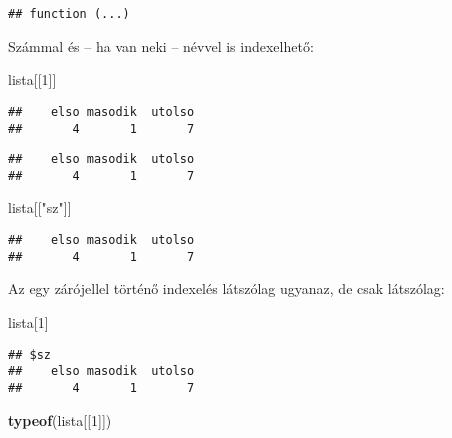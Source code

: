 \documentclass[]{book}
\newenvironment{Shaded}{\begin{snugshade}}{\end{snugshade}}
\newcommand{\KeywordTok}[1]{\textcolor[rgb]{0.13,0.29,0.53}{\textbf{#1}}}
\newcommand{\DecValTok}[1]{\textcolor[rgb]{0.00,0.00,0.81}{#1}}
\newcommand{\StringTok}[1]{\textcolor[rgb]{0.31,0.60,0.02}{#1}}
\newcommand{\OperatorTok}[1]{\textcolor[rgb]{0.81,0.36,0.00}{\textbf{#1}}}
\newcommand{\NormalTok}[1]{#1}
\begin{document}
\begin{verbatim}
## function (...)
\end{verbatim}

Számmal és -- ha van neki -- névvel is indexelhető:

\begin{Shaded}
\begin{Highlighting}[]
\NormalTok{lista[[}\DecValTok{1}\NormalTok{]]}
\end{Highlighting}
\end{Shaded}

\begin{verbatim}
##    elso masodik  utolso 
##       4       1       7
\end{verbatim}

\begin{Shaded}
\end{Shaded}

\begin{verbatim}
##    elso masodik  utolso 
##       4       1       7
\end{verbatim}

\begin{Shaded}
\begin{Highlighting}[]
\NormalTok{lista[[}\StringTok{"sz"}\NormalTok{]]}
\end{Highlighting}
\end{Shaded}

\begin{verbatim}
##    elso masodik  utolso 
##       4       1       7
\end{verbatim}

Az egy zárójellel történő indexelés látszólag ugyanaz, de csak
látszólag:

\begin{Shaded}
\begin{Highlighting}[]
\NormalTok{lista[}\DecValTok{1}\NormalTok{]}
\end{Highlighting}
\end{Shaded}

\begin{verbatim}
## $sz
##    elso masodik  utolso 
##       4       1       7
\end{verbatim}

\begin{Shaded}
\begin{Highlighting}[]
\KeywordTok{typeof}\NormalTok{(lista[[}\DecValTok{1}\NormalTok{]])}
\end{Highlighting}
\end{Shaded}
\end{document}
